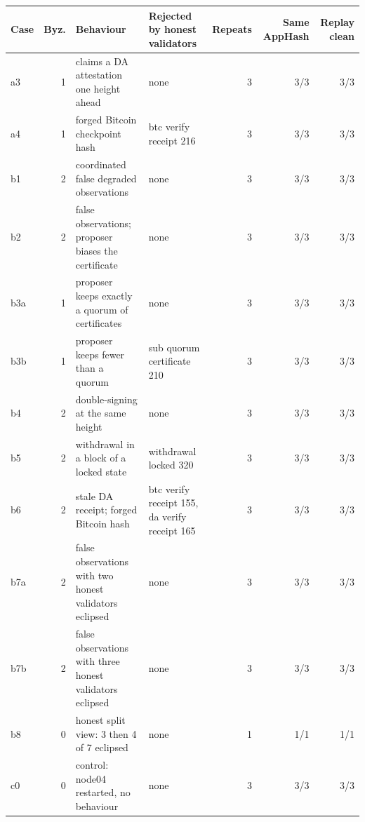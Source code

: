 \begin{tabular}{@{}lrllrrr@{}}
\toprule
\textbf{Case} & \textbf{Byz.} & \textbf{Behaviour} & \textbf{Rejected by honest validators} & \textbf{Repeats} & \textbf{Same AppHash} & \textbf{Replay clean} \\
\midrule
a3 & 1 & claims a DA attestation one height ahead & none & 3 & 3/3 & 3/3 \\
a4 & 1 & forged Bitcoin checkpoint hash & btc verify receipt 216 & 3 & 3/3 & 3/3 \\
b1 & 2 & coordinated false degraded observations & none & 3 & 3/3 & 3/3 \\
b2 & 2 & false observations; proposer biases the certificate & none & 3 & 3/3 & 3/3 \\
b3a & 1 & proposer keeps exactly a quorum of certificates & none & 3 & 3/3 & 3/3 \\
b3b & 1 & proposer keeps fewer than a quorum & sub quorum certificate 210 & 3 & 3/3 & 3/3 \\
b4 & 2 & double-signing at the same height & none & 3 & 3/3 & 3/3 \\
b5 & 2 & withdrawal in a block of a locked state & withdrawal locked 320 & 3 & 3/3 & 3/3 \\
b6 & 2 & stale DA receipt; forged Bitcoin hash & btc verify receipt 155, da verify receipt 165 & 3 & 3/3 & 3/3 \\
b7a & 2 & false observations with two honest validators eclipsed & none & 3 & 3/3 & 3/3 \\
b7b & 2 & false observations with three honest validators eclipsed & none & 3 & 3/3 & 3/3 \\
b8 & 0 & honest split view: 3 then 4 of 7 eclipsed & none & 1 & 1/1 & 1/1 \\
c0 & 0 & control: node04 restarted, no behaviour & none & 3 & 3/3 & 3/3 \\
\bottomrule
\end{tabular}

